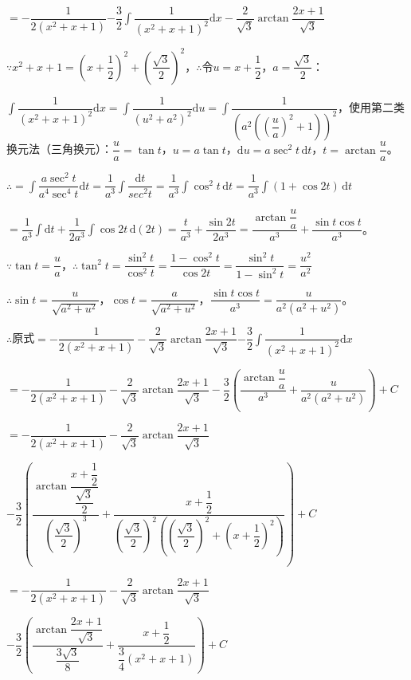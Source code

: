 \documentclass[UTF8, 12pt]{ctexart}
\begin{document}
$=-\dfrac{1}{2(x^2+x+1)}\displaystyle{-\dfrac{3}{2}\int\dfrac{1}{(x^2+x+1)^2}\textrm{d}x}-\dfrac{2}{\sqrt{3}}\arctan\dfrac{2x+1}{\sqrt{3}}$ \smallskip

$\because x^2+x+1=\left(x+\dfrac{1}{2}\right)^2+\left(\dfrac{\sqrt{3}}{2}\right)^2$，$\therefore$令$u=x+\dfrac{1}{2}$，$a=\dfrac{\sqrt{3}}{2}$：

$\displaystyle{\int\dfrac{1}{(x^2+x+1)^2}\textrm{d}x=\int\dfrac{1}{(u^2+a^2)^2}\textrm{d}u=\int\dfrac{1}{\left(a^2\left(\left(\dfrac{u}{a}\right)^2+1\right)\right)^2}}$，使用第二类换元法（三角换元）：$\dfrac{u}{a}=\tan t$，$u=a\tan t$，$\textrm{d}u=a\sec^2t\,\textrm{d}t$，$t=\arctan\dfrac{u}{a}$。

$\therefore=\displaystyle{\int\dfrac{a\sec^2t}{a^4\sec^4t}\textrm{d}t=\dfrac{1}{a^3}\int\dfrac{\textrm{d}t}{sec^2t}}=\dfrac{1}{a^3}\int\cos^2t\,\textrm{d}t=\dfrac{1}{a^3}\int(1+\cos2t)\,\textrm{d}t$

$=\dfrac{1}{a^3}\int\textrm{d}t+\dfrac{1}{2a^3}\int\cos2t\,\textrm{d}(2t)=\dfrac{t}{a^3}+\dfrac{\sin2t}{2a^3}=\dfrac{\arctan\dfrac{u}{a}}{a^3}+\dfrac{\sin t\cos t}{a^3}$。

$\because\tan t=\dfrac{u}{a}$，$\therefore\tan^2t=\dfrac{\sin^2t}{\cos^2t}=\dfrac{1-\cos^2t}{\cos2t}=\dfrac{\sin^2t}{1-\sin^2t}=\dfrac{u^2}{a^2}$

$\therefore\sin t=\dfrac{u}{\sqrt{a^2+u^2}}$，$\cos t=\dfrac{a}{\sqrt{a^2+u^2}}$，$\dfrac{\sin t\cos t}{a^3}=\dfrac{u}{a^2(a^2+u^2)}$。

$\therefore$原式$=-\dfrac{1}{2(x^2+x+1)}-\dfrac{2}{\sqrt{3}}\arctan\dfrac{2x+1}{\sqrt{3}}\displaystyle{-\dfrac{3}{2}\int\dfrac{1}{(x^2+x+1)^2}\textrm{d}x}$

$=-\dfrac{1}{2(x^2+x+1)}-\dfrac{2}{\sqrt{3}}\arctan\dfrac{2x+1}{\sqrt{3}}-\dfrac{3}{2}\left(\dfrac{\arctan\dfrac{u}{a}}{a^3}+\dfrac{u}{a^2(a^2+u^2)}\right)+C$

$=-\dfrac{1}{2(x^2+x+1)}-\dfrac{2}{\sqrt{3}}\arctan\dfrac{2x+1}{\sqrt{3}}$

$-\dfrac{3}{2}\left(\dfrac{\arctan\dfrac{x+\dfrac{1}{2}}{\dfrac{\sqrt{3}}{2}}}{\left(\dfrac{\sqrt{3}}{2}\right)^3}+\dfrac{x+\dfrac{1}{2}}{\left(\dfrac{\sqrt{3}}{2}\right)^2\left(\left(\dfrac{\sqrt{3}}{2}\right)^2+\left(x+\dfrac{1}{2}\right)^2\right)}\right)+C$

$=-\dfrac{1}{2(x^2+x+1)}-\dfrac{2}{\sqrt{3}}\arctan\dfrac{2x+1}{\sqrt{3}}$

$-\dfrac{3}{2}\left(\dfrac{\arctan\dfrac{2x+1}{\sqrt{3}}}{\dfrac{3\sqrt{3}}{8}}+\dfrac{x+\dfrac{1}{2}}{\dfrac{3}{4}\left(x^2+x+1\right)}\right)+C$
\end{document}
